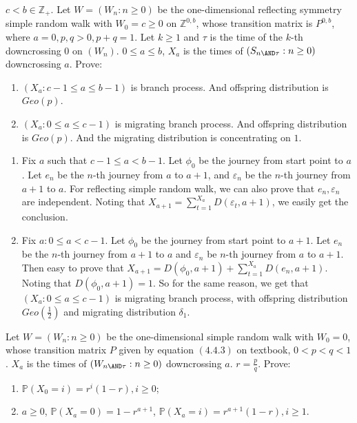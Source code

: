 \documentclass{ctexart}
\begin{document}
\begin{problem}\label{pro:2}
  \(c < b \in \mathbb{Z}_+\). Let \(W=(W_n :n \geq 0)\) be the one-dimensional reflecting symmetry simple
  random walk with \(W_0=c \geq 0\) on \(\mathbb{Z}^{0,b}\), whose transition matrix is \(P^{0,b}\), where
  \(a = 0,p,q >0, p + q =1\).
  Let \(k \geq 1\) and \(\tau\) is the time of the \(k\)-th downcrossing \(0\) on \((W_n)\).
  \(0 \leq a \leq b\),
  \(X_a\) is the times of \((S_{n \AND \tau}:n \geq 0)\) downcrossing \(a\). Prove:
  \begin{enumerate}
    \item \((X_a:c-1 \leq a \leq b-1)\) is branch process.
      And offspring distribution is \(Geo(p)\).
    \item \((X_a:0 \leq a \leq c-1)\) is migrating branch process.
      And offspring distribution is \(Geo(p)\).
      And the migrating distribution is concentrating on \(1\).
  \end{enumerate}
\end{problem}
\begin{solution}
  \begin{enumerate}
    \item Fix \(a\) such that \(c-1 \leq a < b-1\).
      Let \(\phi_0\) be the journey from start point to \(a\).
      Let \(e_n\) be the \(n\)-th journey from \(a\) to \(a+1\), and \(\varepsilon_n\) be the \(n\)-th journey from \(a+1\) to \(a\).
      For reflecting simple random walk, we can also prove that \(e_n,\varepsilon_n\) are independent.
      Noting that \(X_{a+1}=\sum_{t=1}^{X_a} D(\varepsilon_t,a+1)\), we easily get the conclusion.
    \item Fix \(a:0 \leq a<c-1\). Let \(\phi_0\) be the journey from start point to \(a+1\).
      Let \(e_n\) be the \(n\)-th journey from \(a+1\) to \(a\) and \(\varepsilon_n\) be \(n\)-th journey from \(a\) to \(a+1\).
      Then easy to prove that \(X_{a+1}=D(\phi_0,a+1)+\sum_{t=1}^{X_a} D(e_n,a+1)\).
      Noting that \(D(\phi_0,a+1)=1\). So for the same reason, we get that \((X_a:0 \leq a \leq c-1)\) is migrating branch process,
      with offspring distribution \(Geo(\frac{1}{2})\) and migrating distribution \(\delta_1\).
  \end{enumerate}

\end{solution}
\begin{problem}\label{pro:3}
  Let \(W=(W_n:n \geq 0)\) be the one-dimensional simple random walk with \(W_0=0\), whose transition matrix \(P\) given by equation \((4.4.3)\)
  on textbook, \(0< p<q<1\).
  \(X_a\) is the times of \((W_{n \AND \tau}:n \geq 0)\) downcrossing \(a\).
  \(r=\frac{p}{q}\).
  Prove:
  \begin{enumerate}
    \item \label{ite:3.1} \(\mathbb{P}(X_0=i)=r^i(1-r),i \geq 0\);
    \item \(a \geq 0\), \(\mathbb{P}(X_a=0)=1-r^{a +1}\), \(\mathbb{P}(X_a=i)=r^{a + 1}(1 -r),i \geq 1\).
  \end{enumerate}
\end{problem}
\end{document}
